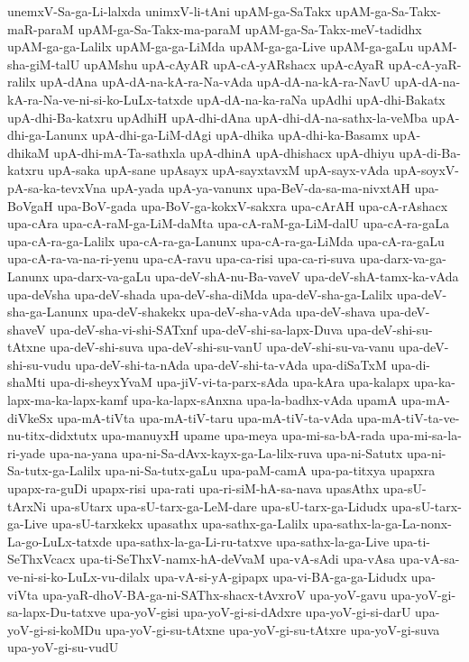 {unemxV-Sa-ga-Li-lalxda
unimxV-li-tAni
upAM-ga-SaTakx
upAM-ga-Sa-Takx-maR-paraM
upAM-ga-Sa-Takx-ma-paraM
upAM-ga-Sa-Takx-meV-tadidhx
upAM-ga-ga-Lalilx
upAM-ga-ga-LiMda
upAM-ga-ga-Live
upAM-ga-gaLu
upAM-sha-giM-talU
upAMshu
upA-cAyAR
upA-cA-yARshacx
upA-cAyaR
upA-cA-yaR-ralilx
upA-dAna
upA-dA-na-kA-ra-Na-vAda
upA-dA-na-kA-ra-NavU
upA-dA-na-kA-ra-Na-ve-ni-si-ko-LuLx-tatxde
upA-dA-na-ka-raNa
upAdhi
upA-dhi-Bakatx
upA-dhi-Ba-katxru
upAdhiH
upA-dhi-dAna
upA-dhi-dA-na-sathx-la-veMba
upA-dhi-ga-Lanunx
upA-dhi-ga-LiM-dAgi
upA-dhika
upA-dhi-ka-Basamx
upA-dhikaM
upA-dhi-mA-Ta-sathxla
upA-dhinA
upA-dhishacx
upA-dhiyu
upA-di-Ba-katxru
upA-saka
upA-sane
upAsayx
upA-sayxtavxM
upA-sayx-vAda
upA-soyxV-pA-sa-ka-tevxVna
upA-yada
upA-ya-vanunx
upa-BeV-da-sa-ma-nivxtAH
upa-BoVgaH
upa-BoV-gada
upa-BoV-ga-kokxV-sakxra
upa-cArAH
upa-cA-rAshacx
upa-cAra
upa-cA-raM-ga-LiM-daMta
upa-cA-raM-ga-LiM-dalU
upa-cA-ra-gaLa
upa-cA-ra-ga-Lalilx
upa-cA-ra-ga-Lanunx
upa-cA-ra-ga-LiMda
upa-cA-ra-gaLu
upa-cA-ra-va-na-ri-yenu
upa-cA-ravu
upa-ca-risi
upa-ca-ri-suva
upa-darx-va-ga-Lanunx
upa-darx-va-gaLu
upa-deV-shA-nu-Ba-vaveV
upa-deV-shA-tamx-ka-vAda
upa-deVsha
upa-deV-shada
upa-deV-sha-diMda
upa-deV-sha-ga-Lalilx
upa-deV-sha-ga-Lanunx
upa-deV-shakekx
upa-deV-sha-vAda
upa-deV-shava
upa-deV-shaveV
upa-deV-sha-vi-shi-SATxnf
upa-deV-shi-sa-lapx-Duva
upa-deV-shi-su-tAtxne
upa-deV-shi-suva
upa-deV-shi-su-vanU
upa-deV-shi-su-va-vanu
upa-deV-shi-su-vudu
upa-deV-shi-ta-nAda
upa-deV-shi-ta-vAda
upa-diSaTxM
upa-di-shaMti
upa-di-sheyxYvaM
upa-jiV-vi-ta-parx-sAda
upa-kAra
upa-kalapx
upa-ka-lapx-ma-ka-lapx-kamf
upa-ka-lapx-sAnxna
upa-la-badhx-vAda
upamA
upa-mA-diVkeSx
upa-mA-tiVta
upa-mA-tiV-taru
upa-mA-tiV-ta-vAda
upa-mA-tiV-ta-ve-nu-titx-didxtutx
upa-manuyxH
upame
upa-meya
upa-mi-sa-bA-rada
upa-mi-sa-la-ri-yade
upa-na-yana
upa-ni-Sa-dAvx-kayx-ga-La-lilx-ruva
upa-ni-Satutx
upa-ni-Sa-tutx-ga-Lalilx
upa-ni-Sa-tutx-gaLu
upa-paM-camA
upa-pa-titxya
upapxra
upapx-ra-guDi
upapx-risi
upa-rati
upa-ri-siM-hA-sa-nava
upasAthx
upa-sU-tArxNi
upa-sUtarx
upa-sU-tarx-ga-LeM-dare
upa-sU-tarx-ga-Lidudx
upa-sU-tarx-ga-Live
upa-sU-tarxkekx
upasathx
upa-sathx-ga-Lalilx
upa-sathx-la-ga-La-nonx-La-go-LuLx-tatxde
upa-sathx-la-ga-Li-ru-tatxve
upa-sathx-la-ga-Live
upa-ti-SeThxVcacx
upa-ti-SeThxV-namx-hA-deVvaM
upa-vA-sAdi
upa-vAsa
upa-vA-sa-ve-ni-si-ko-LuLx-vu-dilalx
upa-vA-si-yA-gipapx
upa-vi-BA-ga-ga-Lidudx
upa-viVta
upa-yaR-dhoV-BA-ga-ni-SAThx-shacx-tAvxroV
upa-yoV-gavu
upa-yoV-gi-sa-lapx-Du-tatxve
upa-yoV-gisi
upa-yoV-gi-si-dAdxre
upa-yoV-gi-si-darU
upa-yoV-gi-si-koMDu
upa-yoV-gi-su-tAtxne
upa-yoV-gi-su-tAtxre
upa-yoV-gi-suva
upa-yoV-gi-su-vudU
}
